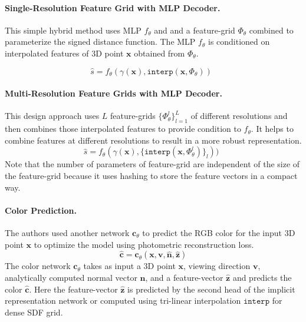 \documentclass[a4paper]{paper}
\begin{document}
\paragraph{Single-Resolution Feature Grid with MLP Decoder.} This simple hybrid method uses MLP $f_\theta$ and and a feature-grid $\Phi_\theta$ combined to parameterize the signed distance function. The MLP $f_\theta$ is conditioned on interpolated features of 3D point $\mathbf{x}$ obtained from $\Phi_\theta$.

\begin{equation}
\hat{s} = f_\theta(\gamma(\mathbf{x}), \texttt{interp}(\mathbf{x}, \Phi_\theta)) \enspace 
\label{eq:single_grid}
\end{equation}

\paragraph{Multi-Resolution Feature Grids with MLP Decoder.} This design approach uses $L$ feature-grids $\{\Phi_\theta^l\}_{l=1}^L$ of different resolutions and then combines those interpolated features to provide condition to $f_\theta$. It helps to combine features at different resolutions to result in a more robust representation. 
\begin{equation}
	\hat{s} = f_\theta(\gamma(\mathbf{x}), \{\texttt{interp}(\mathbf{x}, \Phi_\theta^l)\}_l)) \enspace 
	\label{eq:f_full}
\end{equation}
Note that the number of parameters of feature-grid are independent of the size of the feature-grid because it uses hashing to store the feature vectors in a compact way.

\paragraph{Color Prediction.} The authors used another network $\mathbf{c}_\theta$ to predict the RGB color for the input 3D point $\mathbf{x}$ to optimize the model using photometric reconstruction loss.
\begin{equation}\label{color-mlp}
    \hat{\mathbf{c}} = \mathbf{c}_\theta(\mathbf{x}, \mathbf{v}, \hat{\mathbf{n}}, \hat{\mathbf{z}})
\end{equation}
The color network $\mathbf{c}_\theta$ takes as input a 3D point $\mathbf{x}$, viewing direction $\mathbf{v}$, analytically computed normal vector $\hat{\mathbf{n}}$, and a feature-vector $\hat{\mathbf{z}}$ and predicts the color $\hat{\mathbf{c}}$. Here the feature-vector $\hat{\mathbf{z}}$ is predicted by the second head of the implicit representation network or computed using tri-linear interpolation $\texttt{interp}$ for dense SDF grid.
\end{document}
